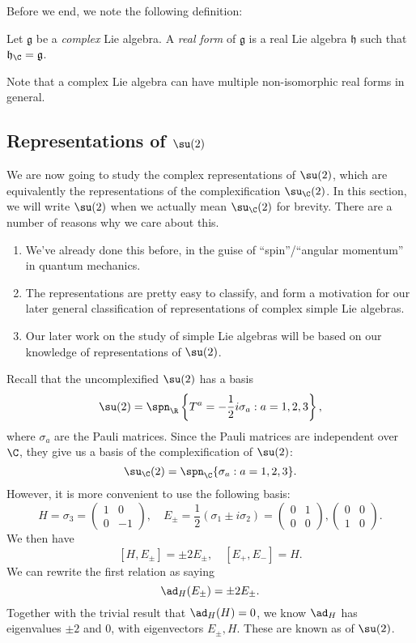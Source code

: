 \documentclass[a4paper]{article}
\begin{document}
Before we end, we note the following definition:
\begin{defi}
  Let $\mathfrak{g}$ be a \emph{complex} Lie algebra. A \emph{real form} of $\mathfrak{g}$ is a real Lie algebra $\mathfrak{h}$ such that $\mathfrak{h}_\C = \mathfrak{g}$.
\end{defi}
Note that a complex Lie algebra can have multiple non-isomorphic real forms in general.

\subsection{Representations of \texorpdfstring{$\su(2)$}{su(2)}}
We are now going to study the complex representations of $\su(2)$, which are equivalently the representations of the complexification $\su_\C(2)$. In this section, we will write $\su(2)$ when we actually mean $\su_\C(2)$ for brevity. There are a number of reasons why we care about this.
\begin{enumerate}
  \item We've already done this before, in the guise of ``spin''/``angular momentum'' in quantum mechanics.
  \item The representations are pretty easy to classify, and form a motivation for our later general classification of representations of complex simple Lie algebras.
  \item Our later work on the study of simple Lie algebras will be based on our knowledge of representations of $\su(2)$.
\end{enumerate}

Recall that the uncomplexified $\su(2)$ has a basis
\[
  \su(2) = \spn_\R\left\{T^a = -\frac{1}{2}i \sigma_a: a = 1, 2, 3\right\},
\]
where $\sigma_a$ are the Pauli matrices. Since the Pauli matrices are independent over $\C$, they give us a basis of the complexification of $\su(2)$:
\[
  \su_\C(2) = \spn_\C\{\sigma_a: a = 1, 2, 3\}.
\]
However, it is more convenient to use the following basis:
\[
  H = \sigma_3 =
  \begin{pmatrix}
    1 & 0\\
    0 & -1
  \end{pmatrix},\quad E_{\pm} = \frac{1}{2} (\sigma_1 \pm i \sigma_2) =
  \begin{pmatrix}
    0 & 1 \\
    0 & 0
  \end{pmatrix},
  \begin{pmatrix}
    0 & 0\\
    1 & 0
  \end{pmatrix}.
\]
We then have
\[
  [H, E_{\pm}] = \pm 2 E_{\pm},\quad [E_+, E_-] = H.
\]
We can rewrite the first relation as saying
\[
  \ad_H(E_{\pm}) = \pm 2 E_{\pm}.
\]
Together with the trivial result that $\ad_H(H) = 0$, we know $\ad_H$ has eigenvalues $\pm 2$ and $0$, with eigenvectors $E_{\pm}, H$. These are known as  of $\su(2)$.
\end{document}
